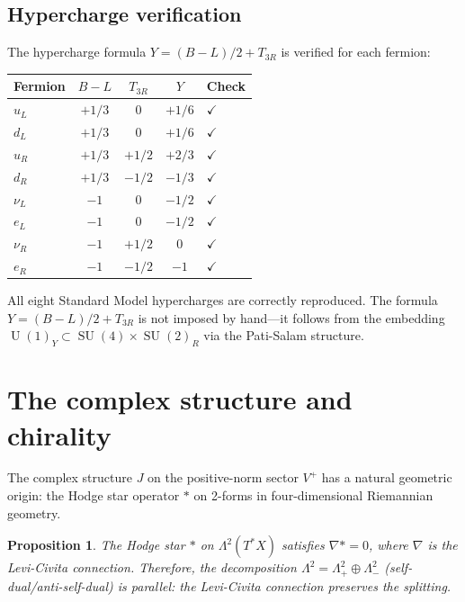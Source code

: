 \documentclass[12pt,a4paper]{article}
\newtheorem{proposition}[theorem]{Proposition}
\theoremstyle{definition}
\newcommand{\SU}{\operatorname{SU}}
\newcommand{\U}{\operatorname{U}}
\begin{document}
\subsection{Hypercharge verification}

The hypercharge formula $Y = (B{-}L)/2 + T_{3R}$ is verified for each fermion:

\begin{center}
\begin{tabular}{lcccl}
\toprule
Fermion & $B-L$ & $T_{3R}$ & $Y$ & Check \\
\midrule
$u_L$ & $+1/3$ & $0$ & $+1/6$ & $\checkmark$ \\
$d_L$ & $+1/3$ & $0$ & $+1/6$ & $\checkmark$ \\
$u_R$ & $+1/3$ & $+1/2$ & $+2/3$ & $\checkmark$ \\
$d_R$ & $+1/3$ & $-1/2$ & $-1/3$ & $\checkmark$ \\
$\nu_L$ & $-1$ & $0$ & $-1/2$ & $\checkmark$ \\
$e_L$ & $-1$ & $0$ & $-1/2$ & $\checkmark$ \\
$\nu_R$ & $-1$ & $+1/2$ & $0$ & $\checkmark$ \\
$e_R$ & $-1$ & $-1/2$ & $-1$ & $\checkmark$ \\
\bottomrule
\end{tabular}
\end{center}

\noindent
All eight Standard Model hypercharges are correctly reproduced.
The formula $Y = (B{-}L)/2 + T_{3R}$ is not imposed by hand---it follows from the embedding $\U(1)_Y \subset \SU(4) \times \SU(2)_R$ via the Pati-Salam structure.


\section{The complex structure and chirality}
\label{sec:chirality}

The complex structure $J$ on the positive-norm sector $V^+$ has a natural geometric origin: the Hodge star operator $\ast$ on 2-forms in four-dimensional Riemannian geometry.

\begin{proposition}
The Hodge star $\ast$ on $\Lambda^2(T^*X)$ satisfies $\nabla \ast = 0$, where $\nabla$ is the Levi-Civita connection.
Therefore, the decomposition $\Lambda^2 = \Lambda^2_+ \oplus \Lambda^2_-$ (self-dual/anti-self-dual) is \emph{parallel}: the Levi-Civita connection preserves the splitting.
\end{proposition}
\end{document}
